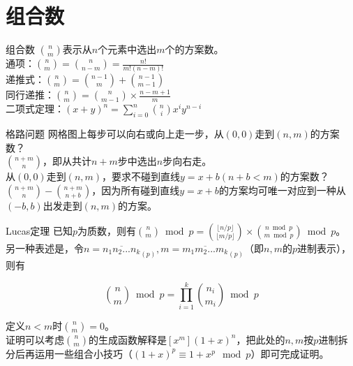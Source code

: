 \documentclass{beamer}
\begin{document}
	\section{组合数}
	\begin{frame}{组合数}
		$\binom{n}{m}$表示从$n$个元素中选出$m$个的方案数。\\
		
		通项：$\binom{n}{m}=\binom{n}{n-m}=\frac{n!}{m!(n-m)!}$\\
		
		递推式：$\binom{n}{m}=\binom{n-1}{m}+\binom{n-1}{m-1}$\\
		
		同行递推：$\binom{n}{m}=\binom{n}{m-1}\times\frac{n-m+1}{m}$\\
		
		二项式定理：$(x+y)^n=\sum_{i=0}^n\binom{n}{i}x^iy^{n-i}$
	\end{frame}
	\begin{frame}{格路问题}
		网格图上每步可以向右或向上走一步，从$(0,0)$走到$(n,m)$的方案数？\pause\\
		
		$\binom{n+m}{n}$，即从共计$n+m$步中选出$n$步向右走。\pause\\
		
		从$(0,0)$走到$(n,m)$，要求不碰到直线$y=x+b(n+b<m)$的方案数？\pause\\
		
		$\binom{n+m}{n}-\binom{n+m}{n+b}$，因为所有碰到直线$y=x+b$的方案均可唯一对应到一种从$(-b,b)$出发走到$(n,m)$的方案。
	\end{frame}
	\begin{frame}{Lucas定理}
		已知$p$为质数，则有$\binom{n}{m} \bmod p = \binom{\lfloor n/p \rfloor}{\lfloor m/p \rfloor}\times \binom{n\bmod p}{m \bmod p} \bmod p$。
		\pause\\
		
		另一种表述是，令$n=\overline{n_1n_2...n_k}_{(p)},m=\overline{m_1m_2...m_k}_{(p)}$（即$n,m$的$p$进制表示），则有
		
		$$\binom{n}{m} \bmod p = \prod_{i=1}^k\binom{n_i}{m_i} \bmod p$$
		
		定义$n < m$时$\binom{n}{m}=0$。
		\pause\\
		
		证明可以考虑$\binom{n}{m}$的生成函数解释是$[x^m](1+x)^n$，把此处的$n, m$按$p$进制拆分后再运用一些组合小技巧（$(1+x)^p \equiv 1+x^p \mod p$）即可完成证明。
	\end{frame}
\end{document}
